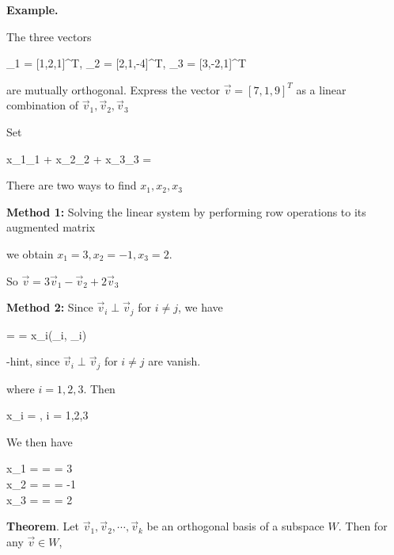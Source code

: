 \documentclass{article}
\begin{document}
\textbf{Example.}

The three vectors

\beqn
{}_{1} = [1,2,1]^{T}, _{2} = [2,1,-4]^{T}, _{3} = [3,-2,1]^{T}
\eeq

are mutually orthogonal. Express the vector $\vec{v} = [7,1,9]^{T}$ as a linear combination of $\vec{v}_{1}, \vec{v}_{2}, \vec{v}_{3}$

Set

\beqn
x_{1}_{1} + x_{2}_{2} + x_{3}_{3} = 
\eeq

There are two ways to find $x_{1}, x_{2}, x_{3}$

\textbf{Method 1:} Solving the linear system by performing row operations to its augmented matrix

\eeq


\beqn
\left[
	\begin{array}{c c c | c}
		1 &  2 &  3  & 7 \\
		2 &  1 &  -2 & 1 \\
		1 & -4 &  1  & 9 \\
	\end{array}
\right]
\eeq

we obtain $x_{1} = 3, x_{2} = -1, x_{3} = 2$. 

So $\vec{v} = 3\vec{v}_{1} - \vec{v}_{2} + 2\vec{v}_{3}$


\textbf{Method 2:} Since $\vec{v}_{i} \perp \vec{v}_{j}$ for $i \neq j$, we have

\beq \label{orthogonal_simplify} 
  =   = x_{i}(_{i}, _{i})
\eeq

-hint, since $\vec{v}_{i} \perp \vec{v}_{j}$ for $i \neq j$ are vanish.

where $i = 1,2,3$. Then

\beqn
x_{i} =  , \text{ } i = 1,2,3
\eeq


We then have

\beqn
x_{1} =  =  = 3 \\
x_{2} =  =  = -1 \\
x_{3} =  =  = 2
\eeq


\textbf{Theorem}. Let $\vec{v}_{1}, \vec{v}_{2}, \cdots, \vec{v}_{k}$ be an orthogonal basis of a subspace $W$. Then for any $\vec{v} \in W $,
\end{document}
